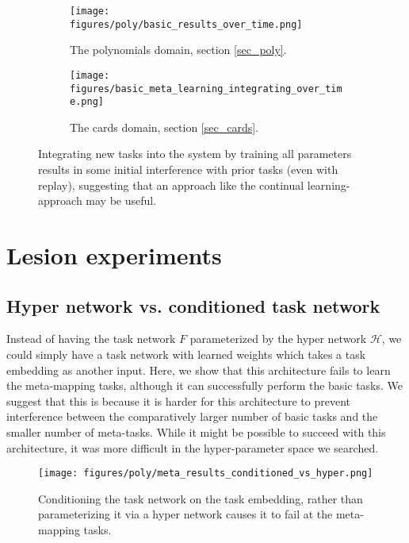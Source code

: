 \documentclass{article}
\begin{document}
\begin{figure}[H]
\centering
\begin{subfigure}[t]{0.5\textwidth}
\texttt{[image: figures/poly/basic\_results\_over\_time.png]}
\caption{The polynomials domain, section \ref{sec_poly}.}
\label{supp_poly_integration_results}
\end{subfigure}%
\begin{subfigure}[t]{0.5\textwidth}
\texttt{[image: figures/basic\_meta\_learning\_integrating\_over\_time.png]}
\caption{The cards domain, section \ref{sec_cards}.}
\label{supp_cards_integration_results}
\end{subfigure}%
\caption{Integrating new tasks into the system by training all parameters results in some initial interference with prior tasks (even with replay), suggesting that an approach like the continual learning-approach may be useful.}
\label{supp_integration_results}
\end{figure}

\section{Lesion experiments}

\subsection{Hyper network vs. conditioned task network}
Instead of having the task network $F$ parameterized by the hyper network $\mathcal{H}$, we could simply have a task network with learned weights which takes a task embedding as another input. Here, we show that this architecture fails to learn the meta-mapping tasks, although it can successfully perform the basic tasks. We suggest that this is because it is harder for this architecture to prevent interference between the comparatively larger number of basic tasks and the smaller number of meta-tasks. While it might be possible to succeed with this architecture, it was more difficult in the hyper-parameter space we searched.\par 
\begin{figure}[H]
\centering
\texttt{[image: figures/poly/meta\_results\_conditioned\_vs\_hyper.png]}
\caption{Conditioning the task network on the task embedding, rather than parameterizing it via a hyper network causes it to fail at the meta-mapping tasks.}
\label{supp_lesion_hyper}
\end{figure}
\end{document}
